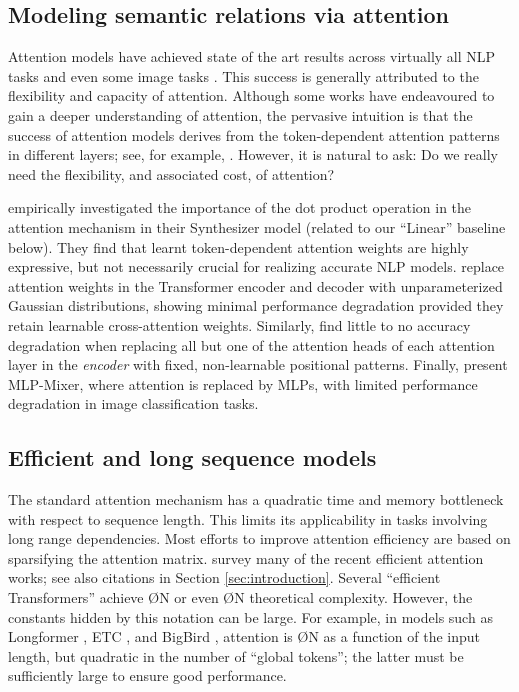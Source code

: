 \subsection{Modeling semantic relations via attention}
\label{subsec:power_of_attention}

Attention models have achieved state of the art results across virtually all NLP tasks and even some image tasks \citep{dosovitskiy2020image}.
This success is generally attributed to the flexibility and capacity of attention. Although some works \citep{ramsauer2020hopfield} have endeavoured to gain a deeper understanding of attention, the pervasive intuition is that the success of attention models derives from the token-dependent attention patterns in different layers; see, for example, \citep{tenney-etal-2019-bert}. However, it is natural to ask: Do we really need the flexibility, and associated cost, of attention? 

\citet{tay2020synthesizer} empirically investigated the importance of the dot product operation in the attention mechanism in their Synthesizer model (related to our ``Linear'' baseline below). They find that learnt token-dependent attention weights are highly expressive, but not necessarily crucial for realizing accurate NLP models. \citet{you2020hard} replace attention weights in the Transformer encoder and decoder with unparameterized Gaussian distributions, showing minimal performance degradation provided they retain learnable cross-attention weights. Similarly, \citet{raganato2020fixed} find little to no accuracy degradation when replacing all but one of the attention heads of each attention layer in the \emph{encoder} with fixed, non-learnable positional patterns. Finally, \citet{tolstikhin2021mlp} present MLP-Mixer, where attention is replaced by MLPs, with limited performance degradation in image classification tasks. 


\subsection{Efficient and long sequence models}
\label{subsec:efficient_transformers}

The standard attention mechanism \citep{vaswani2017attention} has a quadratic time and memory bottleneck with respect to sequence length. This limits its applicability in tasks involving long range dependencies. Most efforts to improve attention efficiency are based on sparsifying the attention matrix. \citet{tay2020efficient} survey many of the recent efficient attention works; see also citations in Section \ref{sec:introduction}. Several ``efficient Transformers'' achieve \O{N} or even \O{N} theoretical complexity. However, the constants hidden by this notation can be large. For example, in models such as Longformer \citep{beltagy2020longformer}, ETC \citep{ainslie2020etc}, and BigBird \citep{zaheer2020big}, attention is \O{N} as a function of the input length, but quadratic in the number of ``global tokens''; the latter must be sufficiently large to ensure good performance.

